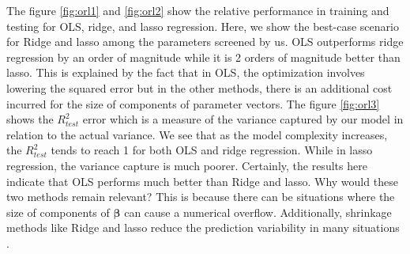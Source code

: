 The figure \ref{fig:orl1} and \ref{fig:orl2} show the relative performance in training and testing for OLS, ridge, and lasso regression. Here, we show the best-case scenario for Ridge and lasso among the parameters screened by us. OLS outperforms ridge regression by an order of magnitude while it is 2 orders of magnitude better than lasso. This is explained by the fact that in OLS, the optimization involves lowering the squared error but in the other methods, there is an additional cost incurred for the size of components of parameter vectors. The figure \ref{fig:orl3} shows the $R^2_{test}$ error which is a measure of the variance captured by our model in relation to the actual variance. We see that as the model complexity increases, the $R^2_{test}$ tends to reach 1 for both OLS and ridge regression. While in lasso regression, the variance capture is much poorer. Certainly, the results here indicate that OLS performs much better than Ridge and lasso. Why would these two methods remain relevant? This is because there can be situations where the size of components of $\boldsymbol \beta$ can cause a numerical overflow. Additionally, shrinkage methods like Ridge and lasso reduce the prediction variability in many situations \cite{friedman2001elements}. 

